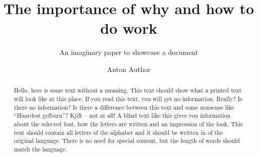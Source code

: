 \title{The importance of why and how to do work}
\subtitle{An imaginary paper to showcase a document}
\extratitle{\raggedleft Author\\ Importance of Work}
\author{Anton Author}
\maketitle



\begin{abstract}
  Hello, here is some text without a meaning. This text should show what a
  printed text will look like at this place. If you read this text, you will
  get no information. Really? Is there no information? Is there a difference
  between this text and some nonsense like “Huardest gefburn”? Kjift – not at
  all! A blind text like this gives you information about the selected font,
  how the letters are written and an impression of the look. This text should
  contain all letters of the alphabet and it should be written in of the
  original language. There is no need for special content, but the length of
  words should match the language.
\end{abstract}

